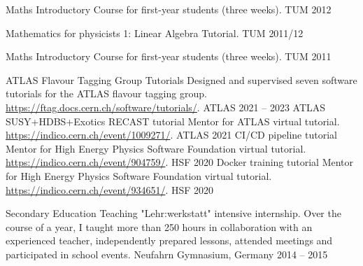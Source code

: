 \begin{cvhonors}
  \cvhonor
    {Maths Introductory Course} %
    {for first-year students (three weeks).} %
    {TUM} %
    {2012} %

  \cvhonor
    {Mathematics for physicists 1: Linear Algebra} %
    {Tutorial.} %
    {TUM} %
    {2011/12} %

  \cvhonor
    {Maths Introductory Course} %
    {for first-year students (three weeks).} %
    {TUM} %
    {2011} %
\end{cvhonors}


\begin{cvhonors}
    \cvhonor
      {ATLAS Flavour Tagging Group Tutorials} %
      {Designed and supervised seven software tutorials for the ATLAS flavour tagging group. \href{Weblink}{https://ftag.docs.cern.ch/software/tutorials/}.} %
      {ATLAS} %
      {2021 -- 2023} %
    \cvhonor
      {ATLAS SUSY+HDBS+Exotics RECAST tutorial} %
      {Mentor for ATLAS virtual tutorial. \href{Indico agenda}{https://indico.cern.ch/event/1009271/}.} %
      {ATLAS} %
      {2021} %
    \cvhonor
      {CI/CD pipeline tutorial} %
      {Mentor for High Energy Physics Software Foundation virtual tutorial. \href{Indico agenda}{https://indico.cern.ch/event/904759/}.} %
      {HSF} %
      {2020} %
    \cvhonor
      {Docker training tutorial} %
      {Mentor for High Energy Physics Software Foundation virtual tutorial. \href{Indico agenda}{https://indico.cern.ch/event/934651/}.} %
      {HSF} %
      {2020} %

    \cvhonor
      {Secondary Education Teaching} %
      {"Lehr:werkstatt" intensive internship. Over the course of a year, I taught more than 250 hours in collaboration with an experienced teacher, independently prepared lessons, attended meetings and participated in school events.} %
      {Neufahrn Gymnasium, Germany} %
      {2014 -- 2015} %
\end{cvhonors}
